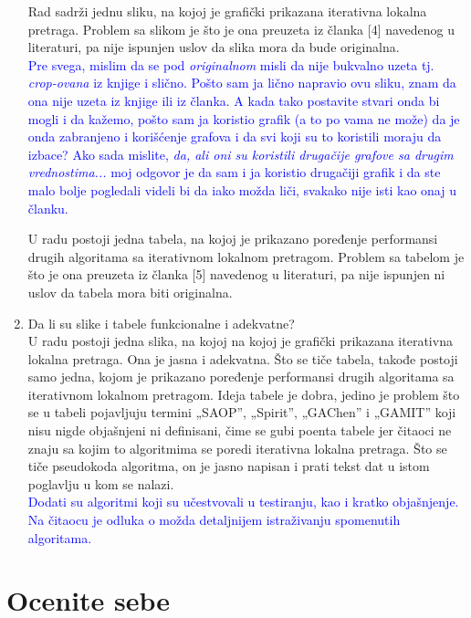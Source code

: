 \documentclass[a4paper]{report}
\newcommand{\odgovor}[1]{\textcolor{blue}{#1}}
\begin{document}
\begin{enumerate}
Rad sadrži jednu sliku, na kojoj je grafički prikazana iterativna lokalna pretraga. Problem sa slikom je što je ona preuzeta iz članka [4] navedenog u literaturi, pa nije ispunjen uslov da slika mora da bude originalna.\\
\odgovor{Pre svega, mislim da se pod \textit{originalnom} misli da nije bukvalno uzeta tj. \textit{crop-ovana} iz knjige i slično. Pošto sam ja lično napravio ovu sliku, znam da ona nije uzeta iz knjige ili iz članka. A kada tako postavite stvari onda bi mogli i da kažemo, pošto sam ja koristio grafik (a to po vama ne može) da je onda zabranjeno i korišćenje grafova i da svi koji su to koristili moraju da izbace? Ako sada mislite, \textit{da, ali oni su koristili drugačije grafove sa drugim vrednostima...} moj odgovor je da sam i ja koristio drugačiji grafik i da ste malo bolje pogledali videli bi da iako možda liči, svakako nije isti kao onaj u članku.\\ }

U radu postoji jedna tabela, na kojoj je prikazano poređenje performansi drugih algoritama sa iterativnom lokalnom pretragom. Problem sa tabelom je što je ona preuzeta iz članka [5] navedenog u literaturi, pa nije ispunjen ni uslov da tabela mora biti originalna.

\item Da li su slike i tabele funkcionalne i adekvatne?\\
U radu postoji jedna slika, na kojoj na kojoj je grafički prikazana iterativna lokalna pretraga. Ona je jasna i adekvatna. Što se tiče tabela, takođe postoji samo jedna, kojom je prikazano poređenje performansi drugih algoritama sa iterativnom lokalnom pretragom. Ideja tabele je dobra, jedino je problem što se u tabeli pojavljuju termini „SAOP”, „Spirit”, „GAChen” i „GAMIT” koji nisu nigde objašnjeni ni definisani, čime se gubi poenta tabele jer čitaoci ne znaju sa kojim to algoritmima se poredi iterativna lokalna pretraga. Što se tiče pseudokoda algoritma, on je jasno napisan i prati tekst dat u istom poglavlju u kom se nalazi.\\
\odgovor{Dodati su algoritmi koji su učestvovali u testiranju, kao i kratko objašnjenje. Na čitaocu je odluka o možda detaljnijem istraživanju spomenutih algoritama. \\ }
\end{enumerate}

\section{Ocenite sebe}
\end{document}
